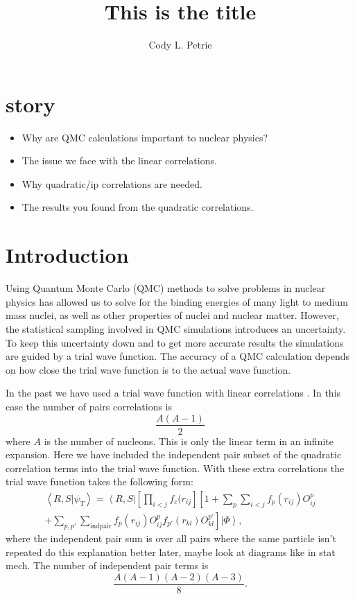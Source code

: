 \documentclass{article}
\title{This is the title}
\author{Cody L. Petrie}
\newcommand{\red}[1]{{\color{red} #1}}
\newcommand{\bra}[1]{\left< #1 \right|}
\newcommand{\ket}[1]{\left| #1 \right>}
\newcommand{\braket}[2]{\left<  #1 | #2 \right>}
\begin{document}
\maketitle

\section{story}
\begin{itemize}
   \item Why are QMC calculations important to nuclear physics?
   \item The issue we face with the linear correlations.
   \item Why quadratic/ip correlations are needed.
   \item The results you found from the quadratic correlations.
\end{itemize}

\section{Introduction}
Using Quantum Monte Carlo (QMC) methods to solve problems in nuclear physics has allowed us to solve for the binding energies of many light to medium mass nuclei, as well as other properties of nuclei and nuclear matter. However, the statistical sampling involved in QMC simulations introduces an uncertainty. To keep this uncertainty down and to get more accurate results the simulations are guided by a trial wave function. The accuracy of a QMC calculation depends on how close the trial wave function is to the actual wave function.

In the past we have used a trial wave function with linear correlations \cite{gandolfi2014}. In this case the number of pairs correlations is
\begin{equation}
   \frac{A(A-1)}{2}
\end{equation}
where $A$ is the number of nucleons. This is only the linear term in an infinite expansion. Here we have included the independent pair subset of the quadratic correlation terms into the trial wave function. With these extra correlations the trial wave function takes the following form:
\begin{multline}
   \braket{R,S}{\psi_T} = \bra{R,S} \left[\prod\limits_{i<j} f_c(r_{ij}\right]\left[1+\sum\limits_p\sum\limits_{i<j} f_p(r_{ij})O^p_{ij} \right. \\
+ \left. \sum\limits_{p,p'}\sum\limits_{\mathrm{indpair}} f_p(r_{ij})O^p_{ij} f_{p'}(r_{kl})O^{p'}_{kl} \right] \ket{\Phi},
\end{multline}
where the independent pair sum is over all pairs where the same particle isn't repeated \red{do this explanation better later, maybe look at diagrams like in stat mech}. The number of independent pair terms is
\begin{equation}
   \frac{A(A-1)(A-2)(A-3)}{8}.
\end{equation}
\end{document}
